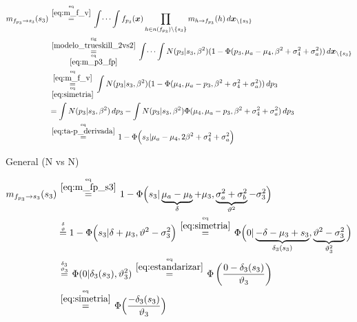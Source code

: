 \documentclass[article]{jss}
\newcommand\hfrac[2]{\genfrac{}{}{0pt}{}{#1}{#2}} %
\begin{document}
\begin{appendix}
\begin{equation}\label{eq:m_fp_s3}
\begin{split}
m_{f_{p_3} \rightarrow s_3}(s_3) & \overset{\hfrac{\text{eq}}{\ref{eq:m_f_v}}}{=} \int \dots \int f_{p_3}(\bm{x}) \prod_{h \in n(f_{p_3}) \setminus \{s_3\} } m_{h \rightarrow f_{p_3}}(h) \, d\bm{x}_{\setminus \{s_3\} }  \\
&\overset{\hfrac{\text{fig}}{\ref{modelo_trueskill_2vs2}}}{\underset{\hfrac{\text{eq}}{\ref{eq:m_p3_fp}}}{=}} \int \dots \int N(p_3| s_3, \beta^2) (1 - \Phi(p_3, \mu_a  - \mu_4, \beta^2 + \sigma_4^2 + \sigma_a^2)) \, d\bm{x}_{\setminus \{s_3\} }\\
& \overset{\hfrac{\text{eq}}{\ref{eq:m_f_v}}}{\underset{\hfrac{\text{eq}}{\ref{eq:simetria}}}{=}} \int N(p_3| s_3, \beta^2) (1 - \Phi(\mu_4, \mu_a  - p_3, \beta^2 + \sigma_4^2 + \sigma_a^2)) \, dp_3 \\
&=\int N(p_3| s_3, \beta^2) \, dp_3 -  \int N(p_3| s_3, \beta^2)  \Phi(\mu_4, \mu_a  - p_3, \beta^2 + \sigma_4^2 + \sigma_a^2) \, dp_3 \\
&\overset{\hfrac{\text{eq}}{\ref{eq:ta-p_derivada}}}{=} 1 - \Phi\Big(s_3| \mu_a-  \mu_4, 2\beta^2 + \sigma_4^2 + \sigma_a^2 \Big)
\end{split}
\end{equation}

General (N vs N)

\begin{equation}
\begin{split}
m_{f_{p_3} \rightarrow s_3}(s_3) & \overset{\hfrac{\text{eq}}{\ref{eq:m_fp_s3}}}{=} 1 - \Phi\Big(s_3| \underbrace{\mu_a-\mu_b}_{\delta}+\mu_3, \underbrace{\sigma_a^2 + \sigma_b^2}_{\vartheta^2} - \sigma_3^2 \Big) \\
& \overset{\hfrac{\delta}{\vartheta}}{=} 1 - \Phi\Big(s_3| \delta +\mu_3, \vartheta^2- \sigma_3^2 \Big) \overset{\hfrac{\text{eq}}{\ref{eq:simetria}}}{=} \Phi\Big(0| \underbrace{-\delta-\mu_3+s_3}_{\delta_3(s_3)}, \underbrace{\vartheta^2- \sigma_3^2}_{\vartheta_3^2} \Big) \\
& \overset{\hfrac{\delta_3}{\vartheta_3}}{=} \Phi(0|\delta_3(s_3),\vartheta_3^2)  \overset{\hfrac{\text{eq}}{\ref{eq:estandarizar}}}{=}  \Phi\left(\frac{0-\delta_3(s_3)}{\vartheta_3}\right) \\
& \overset{\hfrac{\text{eq}}{\ref{eq:simetria}}}{=} \Phi\Big(\frac{-\delta_3(s_3)}{\vartheta_3}\Big)
\end{split}
\end{equation}


\end{appendix}
\end{document}
